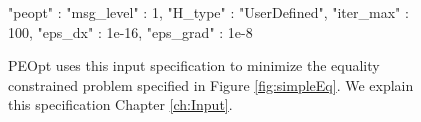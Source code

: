\begin{figure}
    \begin{lstPeoptJSON}
{
   "peopt" : {
      "msg_level" : 1,
      "H_type" : "UserDefined",
      "iter_max" : 100,
      "eps_dx" : 1e-16,
      "eps_grad" : 1e-8
   }
}
\end{lstPeoptJSON}
    \caption{PEOpt uses this input specification to minimize the equality constrained problem specified in Figure \ref{fig:simpleEq}.  We explain this specification Chapter \ref{ch:Input}.} 
    \label{fig:simpleEqJSON}
\end{figure}
